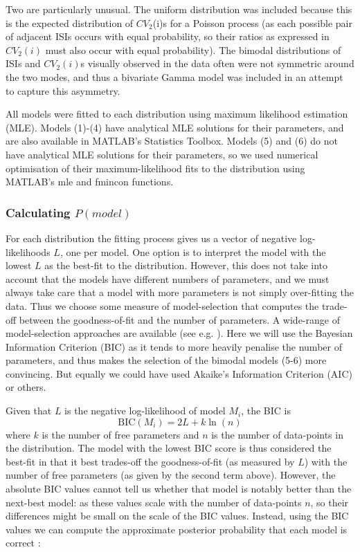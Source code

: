 \documentclass[11pt,a4paper]{article}
\begin{document}
Two are particularly unusual. The uniform distribution was included because this is the expected distribution of $CV_2$(i)s for a Poisson process (as each possible pair of adjacent ISIs occurs with equal probability, so their ratios as expressed in $CV_2(i)$ must also occur with equal probability). The bimodal distributions of ISIs and $CV_2(i)$s visually observed in the data often were not symmetric around the two modes, and thus a bivariate Gamma model was included in an attempt to capture this asymmetry.

All models were fitted to each distribution using maximum likelihood estimation (MLE). Models (1)-(4) have analytical MLE solutions for their parameters, and are also available in MATLAB's Statistics Toolbox. Models (5) and (6) do not have analytical MLE solutions for their parameters, so we used numerical optimisation of their maximum-likelihood fits to the distribution using MATLAB's mle and fmincon functions. 

\subsubsection{Calculating $P(model)$}
For each distribution the fitting process gives us a vector of negative log-likelihoods $L$, one per model.  One option is to interpret the model with the lowest $L$ as the best-fit to the distribution. However, this does not take into account that the models have different numbers of parameters, and we must always take care that a model with more parameters is not simply over-fitting the data. Thus we choose some measure of model-selection that computes the trade-off between the goodness-of-fit and the number of parameters. A wide-range of model-selection approaches are available (see e.g. \citep{Wasserman2004}). Here we will use the Bayesian Information Criterion (BIC) as it tends to more heavily penalise the number of parameters, and thus makes the selection of the bimodal models (5-6) more convincing. But equally we could have used Akaike's Information Criterion (AIC) or others.

Given that $L$ is the negative log-likelihood of model $M_i$, the BIC is
\begin{equation}
\mathrm{BIC}(M_i) = 2L + k \ln(n)
\end{equation}
where $k$ is the number of free parameters and $n$ is the number of data-points in the distribution. The model with the lowest BIC score is thus considered the best-fit in that it best trades-off the goodness-of-fit (as measured by $L$) with the number of free parameters (as given by the second term above). However, the absolute BIC values cannot tell us whether that model is notably better than the next-best model: as these values scale with the number of data-points $n$, so their differences might be small on the scale of the BIC values. Instead, using the BIC values we can compute the approximate posterior probability that each model is correct \citep{Wasserman2004}:
\end{document}
